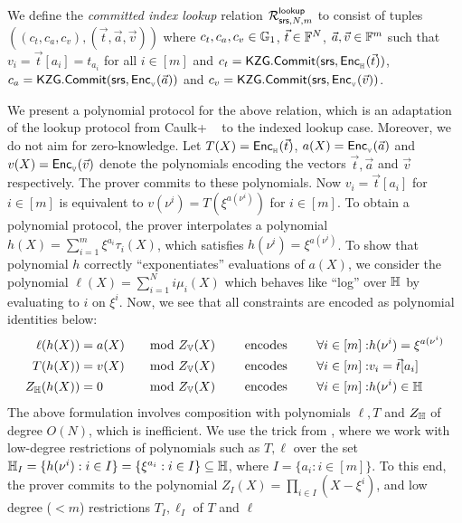 \begin{definition}\label{defn:comm-index-lookup}
We define the {\em committed index lookup} relation $\mathcal{R}^{\mathsf{lookup}}_{\mathsf{srs},N,m}$ to consist of tuples
$((c_t,c_a,c_v),(\vec{t},\vec{a},\vec{v}))$ where $c_t,c_a,c_v\in \mathbb{G}_1$, $\vec{t}\in \mathbb{F}^N$, $\vec{a},\vec{v}\in \mathbb{F}^m$ such
that $v_i = \vec{t}[a_i]=t_{a_i}$ for all $i\in [m]$ and $c_t = \mathsf{KZG.Commit}(\mathsf{srs}, \mathsf{Enc}_{{}_{\mathbb{H}}}(\vec{t}))$, $c_a=\mathsf{KZG.Commit}(\mathsf{srs},\mathsf{Enc}_{{}_{\mathbb{V}}}(\vec{a}))$
and $c_v=\mathsf{KZG.Commit}(\mathsf{srs},\mathsf{Enc}_{{}_{\mathbb{V}}}(\vec{v}))$.
\end{definition}

We present a polynomial protocol for the above relation, which is an adaptation of the lookup protocol from Caulk+ ~\cite{EPRINT:PosKat22}
to the indexed lookup case. Moreover, we do not aim for zero-knowledge. Let $T(X)=\mathsf{Enc}_{{}_{\mathbb{H}}}(\vec{t})$, $a(X)=\mathsf{Enc}_{{}_{\mathbb{V}}}(\vec{a})$ and
$v(X)=\mathsf{Enc}_{{}_{\mathbb{V}}}(\vec{v})$ denote the polynomials encoding the vectors $\vec{t},\vec{a}$ and $\vec{v}$ respectively. The prover commits
to these polynomials. Now $v_i = \vec{t}[a_i]$ for $i\in [m]$ is equivalent to $v(\nu^i) = T(\xi^{a(\nu^i)})$ for $i\in [m]$. To
obtain a polynomial protocol, the prover interpolates a polynomial $h(X)=\sum_{i=1}^m \xi^{a_i}\tau_i(X)$, which satisfies
$h(\nu^i)=\xi^{a(\nu^i)}$. To show that polynomial $h$ correctly ``exponentiates'' evaluations of $a(X)$, we consider the
polynomial $\ell(X)=\sum_{i=1}^N i\mu_i(X)$ which behaves like ``log'' over $\mathbb{H}$ by evaluating to $i$ on $\xi^i$. Now, we see
that all constraints are encoded as polynomial identities below:
\begin{alignat}{3}
\ell(h(X)) &= a(X) &\quad \text{mod } Z_{\mathbb{V}}(X) &&\quad\text{ encodes } &&\quad \forall i\in [m]:& h(\nu^i) = \xi^{a(\nu^i)}  \\
T(h(X)) &= v(X) &\quad \text{mod } Z_{\mathbb{V}}(X) &&\quad\text{ encodes } &&\quad \forall i\in [m]:& v_i = \vec{t}[a_i] \\
Z_{\mathbb{H}}(h(X)) &= 0 &\quad \text{mod } Z_{\mathbb{V}}(X) &&\quad\text{ encodes } &&\quad \forall i \in [m]:& h(\nu^i)\in \mathbb{H}
\end{alignat}
The above formulation involves composition with polynomials $\ell,T$ and $Z_\mathbb{H}$ of degree $O(N)$, which is inefficient. We use the trick from
\cite{EPRINT:PosKat22}, where we work with low-degree restrictions of polynomials such as $T, \ell$ over the set
$\mathbb{H}_I=\{{h(\nu^i)}: i\in I\}=\{\xi^{a_i}:i\in I\}\subseteq \mathbb{H}$, where $I=\{a_i: i\in [m]\}$. To this end, the prover
commits to the polynomial $Z_I(X)=\prod_{i\in I}(X-\xi^i)$, and low degree ($<m$) restrictions $T_I, \ell_I$ of $T$ and $\ell$
